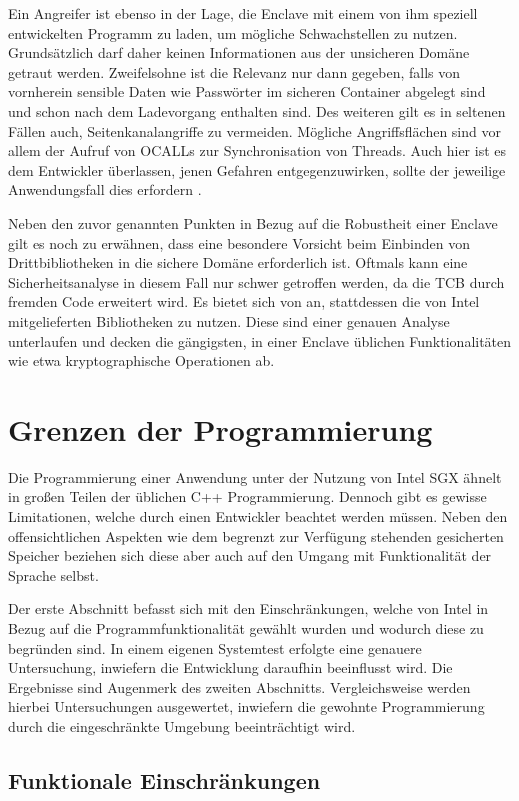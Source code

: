 Ein Angreifer ist ebenso in der Lage, die Enclave mit einem von ihm speziell entwickelten Programm zu laden, um mögliche Schwachstellen zu nutzen. Grundsätzlich darf daher keinen Informationen aus der unsicheren Domäne getraut werden. Zweifelsohne ist die Relevanz nur dann gegeben, falls von vornherein sensible Daten wie Passwörter im sicheren Container abgelegt sind und schon nach dem Ladevorgang enthalten sind. Des weiteren gilt es in seltenen Fällen auch, Seitenkanalangriffe zu vermeiden. Mögliche Angriffsflächen sind vor allem der Aufruf von OCALLs zur Synchronisation von Threads. Auch hier ist es dem Entwickler überlassen, jenen Gefahren entgegenzuwirken, sollte der jeweilige Anwendungsfall dies erfordern \cite{M.2016}.

Neben den zuvor genannten Punkten in Bezug auf die Robustheit einer Enclave gilt es noch zu erwähnen, dass eine besondere Vorsicht beim Einbinden von Drittbibliotheken in die sichere Domäne erforderlich ist. Oftmals kann eine Sicherheitsanalyse in diesem Fall nur schwer getroffen werden, da die TCB durch fremden Code erweitert wird. Es bietet sich von an, stattdessen die von Intel mitgelieferten Bibliotheken zu nutzen. Diese sind einer genauen Analyse unterlaufen und decken die gängigsten, in einer Enclave üblichen Funktionalitäten wie etwa kryptographische Operationen ab. 
\section{Grenzen der Programmierung}

Die Programmierung einer Anwendung unter der Nutzung von Intel SGX ähnelt in großen Teilen der üblichen C++ Programmierung. Dennoch gibt es gewisse Limitationen, welche durch einen Entwickler beachtet werden müssen. Neben den offensichtlichen Aspekten wie dem begrenzt zur Verfügung stehenden gesicherten Speicher beziehen sich diese aber auch auf den Umgang mit Funktionalität der Sprache selbst. 

Der erste Abschnitt befasst sich mit den Einschränkungen, welche von Intel in Bezug auf die Programmfunktionalität gewählt wurden und wodurch diese zu begründen sind. In einem eigenen Systemtest erfolgte eine genauere Untersuchung, inwiefern die Entwicklung daraufhin beeinflusst wird. Die Ergebnisse sind Augenmerk des zweiten Abschnitts. Vergleichsweise werden hierbei Untersuchungen ausgewertet, inwiefern die gewohnte Programmierung durch die eingeschränkte Umgebung beeinträchtigt wird.

\subsection{Funktionale Einschränkungen}

